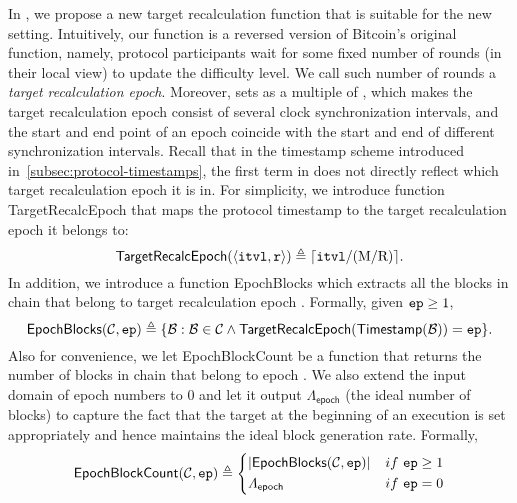 In \timekeeper, we propose a new target recalculation function that is suitable for the new setting.
%
Intuitively, our function is a reversed version of Bitcoin's original function, namely, protocol participants wait for some fixed number of rounds \diffLen (in their local view) to update the difficulty level.
%
We call such \diffLen number of rounds a {\em target recalculation epoch}.
%
Moreover, \timekeeper sets \diffLen as a multiple of \syncLen, which makes the target recalculation epoch consist of several clock synchronization intervals, and the start and end point of an epoch coincide with the start and end of different synchronization intervals.
%
Recall that in the \timekeeper timestamp scheme introduced in~\cref{subsec:protocol-timestamps}, the first term in \protocolTime{\interval}{\round} does not directly reflect which target recalculation epoch it is in.
%
For simplicity, we introduce function \textsf{TargetRecalcEpoch} that maps the protocol timestamp to the target recalculation epoch it belongs to:
%
\[ \mathsf{TargetRecalcEpoch}(\langle \mathtt{itvl}, \mathtt{r} \rangle) \triangleq \lceil \mathtt{itvl} / (\mathrm{M} / \mathrm{R}) \rceil. \]
%
In addition, we introduce a function \textsf{EpochBlocks} which extracts all the blocks in chain \chain that belong to target recalculation epoch \epoch.
%
Formally, given $\mathtt{ep} \ge 1$,
%
\[ \mathsf{EpochBlocks}(\mathcal{C}, \mathtt{ep}) \triangleq \{ \mathcal{B} : \mathcal{B} \in \mathcal{C} \wedge \mathsf{TargetRecalcEpoch}(\mathsf{Timestamp}(\mathcal{B})) = \mathtt{ep} \}. \]
%
Also for convenience, we let \textsf{EpochBlockCount} be a function that returns the number of blocks in chain \chain that belong to epoch \epoch.
%
We also extend the input domain of epoch numbers to 0 and let it output $\varLambda_{\mathsf{epoch}}$ (the ideal number of blocks) to capture the fact that the target at the beginning of an execution is set appropriately and hence maintains the ideal block generation rate.
%
Formally,
%
\begin{equation} \label{eq:epochblockcount}
    \mathsf{EpochBlockCount}(\mathcal{C}, \mathtt{ep}) \triangleq
    \left\{
    \begin{aligned}
         & |\mathsf{EpochBlocks}(\mathcal{C}, \mathtt{ep})| \\
         & \varLambda_{\mathsf{epoch}}
    \end{aligned}
    \right.
    ~~
    \left.
    \begin{aligned}
         & if~\mathtt{ep} \ge 1 \\
         & if~\mathtt{ep} = 0
    \end{aligned}
    \right.
\end{equation}

